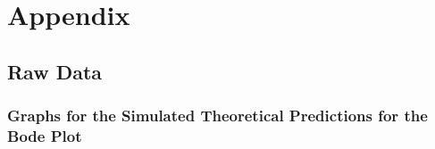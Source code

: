 \documentclass[12pt]{article}
\begin{document}
\newpage






\newpage

\section*{Appendix} \label{sec:A}

\subsection*{Raw Data} \label{sec:A.1}

\subsubsection*{Graphs for the Simulated Theoretical Predictions for the Bode Plot} \label{sec:A.1.1}

\vspace{1cm}
\end{document}
